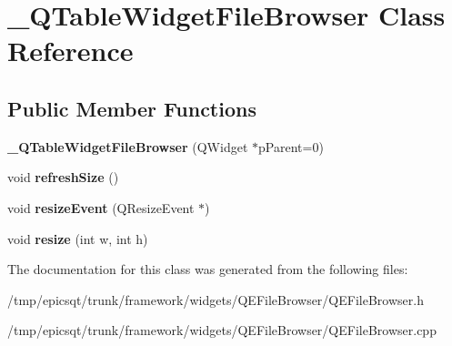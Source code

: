 \hypertarget{class__QTableWidgetFileBrowser}{
\section{\_\-QTableWidgetFileBrowser Class Reference}
\label{class__QTableWidgetFileBrowser}
}
\subsection*{Public Member Functions}
\begin{DoxyCompactItemize}
\item 
\hypertarget{class__QTableWidgetFileBrowser_a8f5d4a4b214cbfdc932719745ac92acb}{
{\bfseries \_\-QTableWidgetFileBrowser} (QWidget $\ast$pParent=0)}
\label{class__QTableWidgetFileBrowser_a8f5d4a4b214cbfdc932719745ac92acb}

\item 
\hypertarget{class__QTableWidgetFileBrowser_ab086b8df3575f4f956e8a9cef3931587}{
void {\bfseries refreshSize} ()}
\label{class__QTableWidgetFileBrowser_ab086b8df3575f4f956e8a9cef3931587}

\item 
\hypertarget{class__QTableWidgetFileBrowser_a460b25d0d2ff08041a9d0afb1fe79704}{
void {\bfseries resizeEvent} (QResizeEvent $\ast$)}
\label{class__QTableWidgetFileBrowser_a460b25d0d2ff08041a9d0afb1fe79704}

\item 
\hypertarget{class__QTableWidgetFileBrowser_a92be1a9b340a4bf87991d34f6fedd33c}{
void {\bfseries resize} (int w, int h)}
\label{class__QTableWidgetFileBrowser_a92be1a9b340a4bf87991d34f6fedd33c}

\end{DoxyCompactItemize}


The documentation for this class was generated from the following files:\begin{DoxyCompactItemize}
\item 
/tmp/epicsqt/trunk/framework/widgets/QEFileBrowser/QEFileBrowser.h\item 
/tmp/epicsqt/trunk/framework/widgets/QEFileBrowser/QEFileBrowser.cpp\end{DoxyCompactItemize}
